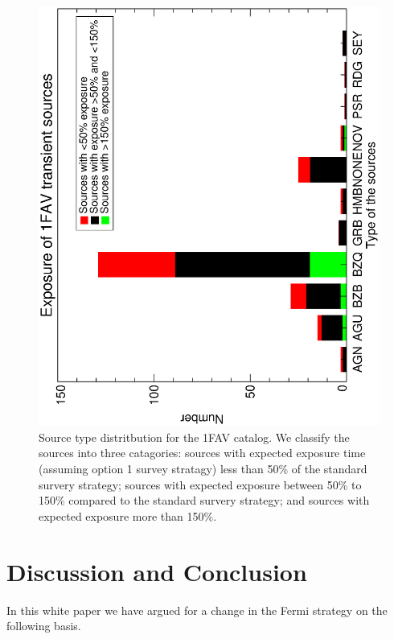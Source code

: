 \documentclass[aps,prd,superscriptaddress,showpacs,nofootinbib,fixlfloat, 12pt]{revtex4-1}
\begin{document}
\begin{figure}[t]
  \begin{center}
    \includegraphics[width=0.7\linewidth, angle=-90]{plots/source_type_hist.ps}
    \vspace{-0.5cm}
  \end{center}
  \caption{Source type distritbution for the 1FAV catalog. We classify the sources into three catagories: sources with expected exposure time (assuming option 1 survey stratagy) less than 50\% of the standard survery strategy; sources with expected exposure between 50\% to 150\% compared to the standard survery strategy; and sources with expected exposure more than 150\%. }
  \label{fig:transhist}
\end{figure}


\section{Discussion and Conclusion}
\label{sec:Conclusion}

In this white paper we have argued for a change in the Fermi strategy on the
following basis.
\end{document}
